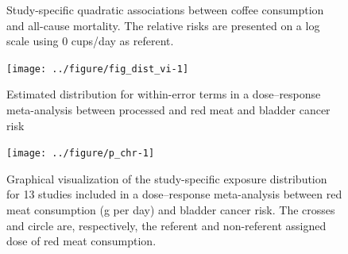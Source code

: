 \documentclass[11pt,a4paper,twoside,openany]{book}\usepackage{knitr}
\begin{document}
{\begin{knitrout}
\begin{figure}[ht!]
\caption[Study-specific quadratic associations between coffee consumption and all-cause mortality]{Study-specific quadratic associations between coffee consumption and all-cause mortality. The relative risks are presented on a log scale using 0 cups/day as referent.}\label{fig:p_indiv}
\end{figure}


\end{knitrout}

\begin{knitrout}\footnotesize
{}\color{fgcolor}\begin{figure}[ht!]

{\centering \texttt{[image: ../figure/fig\_dist\_vi-1]} 

}

\caption[Estimated distribution for within-error terms in a dose--response meta-analysis between processed and red meat and bladder cancer risk \citep{crippa2016red}]{Estimated distribution for within-error terms in a dose--response meta-analysis between processed and red meat and bladder cancer risk \citep{crippa2016red}}\label{fig:fig_dist_vi}
\end{figure}


\end{knitrout}

\begin{knitrout}\footnotesize
{}\color{fgcolor}\begin{figure}[ht!]

{\centering \texttt{[image: ../figure/p\_chr-1]} 

}

\caption[Graphical visualization of the study-specific exposure distribution for 13 studies included in a dose--response meta-analysis between red meat consumption (g per day) and bladder cancer risk]{Graphical visualization of the study-specific exposure distribution for 13 studies included in a dose--response meta-analysis between red meat consumption (g per day) and bladder cancer risk. The crosses and circle are, respectively, the referent and non-referent assigned dose of red meat consumption.}\label{fig:p_chr}
\end{figure}


\end{knitrout}

\begin{knitrout}\footnotesize
{}\color{fgcolor}\begin{figure}[ht!]


\end{figure}
\end{knitrout}}
\end{document}
